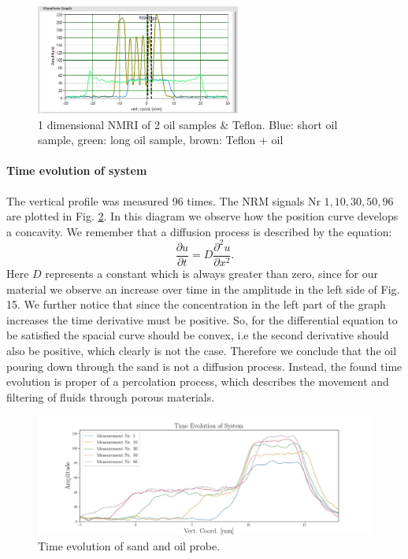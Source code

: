 \begin{figure}[!htbp]
  \begin{center}
    \includegraphics[width= 0.6\textwidth]{./Protocol images/III/three_profiles.png}
 \caption{1 dimensional NMRI of 2 oil samples \& Teflon. Blue: short oil sample, green: long oil sample, brown: Teflon + oil}
    \label{fig:teflon}
   \end{center}
 \end{figure} 
\paragraph{Time evolution of system}
The vertical profile was measured 96 times. The NRM signals Nr $ 1,10, 30, 50, 96$ are plotted in Fig. \ref{fig:time evolution system}. In this diagram we observe how the position curve develops a concavity. We remember that a diffusion process is described by the equation:
\begin{equation}
\frac{\partial u}{\partial t} = D\frac{\partial^2 u}{\partial x^2}.
\end{equation}
Here $D$ represents a constant which is always greater than zero, since for our material we observe an increase over time in the amplitude in the left side of Fig. 15. We further notice that since the concentration in the left part of the graph increases the time derivative must be positive. So, for the differential equation to be satisfied the spacial curve should be convex, i.e the second derivative should also be positive, which clearly is not the case. Therefore we conclude that the oil pouring down through the sand is not a diffusion process. Instead, the found time evolution is proper of a percolation process, which describes the movement and filtering of fluids through porous materials. 
\begin{figure}[!htbp]
  \begin{center}
    \includegraphics[width= 1.0\textwidth]{./Latex images/time_evolution.jpg}
 \caption{Time evolution of sand and oil probe.}
    \label{fig:time evolution system}
   \end{center}
 \end{figure}
